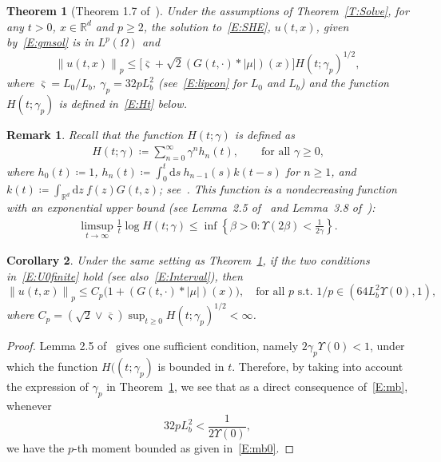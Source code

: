 \documentclass[sn-mathphys]{sn-jnl}%
\renewcommand{\R}{\mathbb{R}}
\newcommand{\Norm}[1]{\left\| #1 \right\|}
\newcommand{\ud}{\ensuremath{\mathrm{d}}}
\numberwithin{equation}{section}
\theoremstyle{thmstyleone}%
\newtheorem{theorem}{Theorem}[section]%
\newtheorem{corollary}[theorem]{Corollary}
\theoremstyle{thmstyletwo}%
\newtheorem{remark}{Remark}[section]%
\theoremstyle{thmstylethree}%
\begin{document}
\begin{theorem}[Theorem 1.7 of~\cite{chen.huang:19:comparison}]\label{T:ExUn}
  Under the assumptions of Theorem~\ref{T:Solve}, for any $t>0$, $x \in \R^d$ and $p \ge 2$, the
  solution to~\eqref{E:SHE}, $u(t,x)$, given by~\eqref{E:gmsol} is in $L^p (\Omega)$ and
  \begin{equation}\label{E:mb}
    \Norm{u(t,x)}_p \le \big[\bar{\varsigma}+\sqrt{2}(G(t,\cdot) * \lvert\mu\rvert)(x)\big]H(t;\gamma_p)^{1/2},
  \end{equation}
  where $\bar{\varsigma} = L_0/L_b$, $\gamma_p = 32pL_b^2$ (see~\eqref{E:lipcon} for $L_0$ and $L_b$)
  and the function $H(t;\gamma_p)$ is defined in~\eqref{E:Ht} below.
\end{theorem}

\begin{remark}\label{R:H}
  Recall that the function $H(t;\gamma)$ is defined as
  \begin{align}\label{E:Ht}
     H(t;\gamma) \coloneqq \sum_{n=0}^\infty \gamma^n h_n(t),\qquad\text{for all $\gamma\ge 0$,}
  \end{align}
  where $h_0(t) \coloneqq 1$, $h_n(t) \coloneqq \int_0^t \ud s \: h_{n-1}(s) k(t-s)$ for $n\ge 1$,
  and $k(t) \coloneqq \int_{\R^d}\ud z\: f(z)G(t,z)$; see~\cite{chen.kim:19:nonlinear,
  chen.huang:19:comparison}. This function is a nondecreasing function with an exponential upper
  bound (see Lemma~2.5 of~\cite{chen.kim:19:nonlinear} and Lemma~3.8
  of~\cite{balan.chen:18:parabolic}):
  \begin{align*}
    \limsup_{t\to\infty} \frac{1}{t} \log H(t;\gamma)
    \le \inf \left\{\beta>0: \Upsilon\left(2\beta\right)<\frac{1}{2\gamma}\right\} .
  \end{align*}
\end{remark}


\begin{corollary}\label{C:Mom}
  Under the same setting as Theorem~\ref{T:ExUn}, if the two conditions in~\eqref{E:U0finite} hold
  (see also~\eqref{E:Interval}), then
  \begin{equation}\label{E:mb0}
    \Norm{u(t,x)}_p \le C_p\bigg(1+ (G(t, \cdot)*\lvert\mu\rvert)(x) \bigg),
    \quad \text{for all $p$ s.t. $1/p \in \left(64 L_b^2\Upsilon(0),1\right)$},
  \end{equation}
  where $C_p = \left(\sqrt{2}\vee \overline{\varsigma}\right)\sup_{t\ge 0}
  H(t;\gamma_p)^{1/2}<\infty$.
\end{corollary}
\begin{proof}
  Lemma 2.5 of~\cite{chen.kim:19:nonlinear} gives one sufficient condition, namely
  $2\gamma_p\Upsilon(0)<1$, under which the function $H((t;\gamma_p)$ is bounded in $t$. Therefore,
  by taking into account the expression of $\gamma_p$ in Theorem~\ref{T:ExUn}, we see that as a
  direct consequence of~\eqref{E:mb}, whenever
  \begin{equation}\label{E:pLip}
     32 p L_b^2 < \frac{1}{2\Upsilon(0)},
  \end{equation}
  we have the $p$-th moment bounded as given in~\eqref{E:mb0}.
\end{proof}
\end{document}
